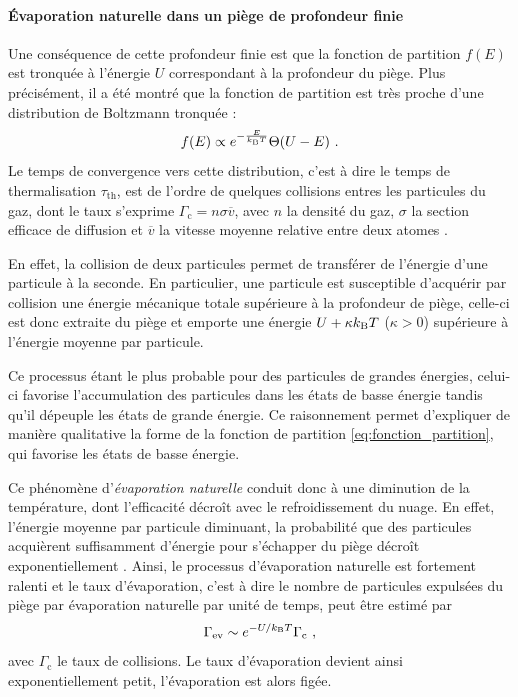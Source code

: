 \paragraph*{Évaporation naturelle dans un piège de profondeur finie}
Une conséquence de cette profondeur finie est que la fonction de partition $f(E)$ est tronquée à l'énergie $U$ correspondant à la profondeur du piège. Plus précisément, il a été montré que la fonction de partition est très proche d'une distribution de Boltzmann tronquée \citep{luiten1996kinetic}:
\begin{equation}
f(E)\propto e^{-\frac{E}{k_{\mathrm{B}} T}} \Theta(U-E) \text{ .}
\label{eq:fonction_partition}
\end{equation}
Le temps de convergence vers cette distribution, c'est à dire le temps de thermalisation $\tau_{\mathrm{th}}$, est de l'ordre de quelques collisions entres les particules du gaz, dont le taux s'exprime $\Gamma_{\mathrm{c}}=n \sigma \overline{v}$, avec $n$ la densité du gaz, $\sigma$ la section efficace de diffusion et $\overline{v}$ la vitesse moyenne relative entre deux atomes \citep{walraven2010elements}.

En effet, la collision de deux particules permet de transférer de l'énergie d'une particule à la seconde. En particulier, une particule est susceptible d'acquérir par collision une énergie mécanique totale supérieure à la profondeur de piège, celle-ci est donc extraite du piège et emporte une énergie $U+\kappa k_{\mathrm{B}} T$ ($\kappa>0$) supérieure à l'énergie moyenne par particule. %

Ce processus étant le plus probable pour des particules de grandes énergies, celui-ci favorise l'accumulation des particules dans les états de basse énergie tandis qu'il dépeuple les états de grande énergie. Ce raisonnement permet d'expliquer de manière qualitative la forme de la fonction de partition \ref{eq:fonction_partition}, qui favorise les états de basse énergie.

Ce phénomène d'\emph{évaporation naturelle} conduit donc à une diminution de la température, dont l'efficacité décroît avec le refroidissement du nuage. En effet, l'énergie moyenne par particule diminuant, la probabilité que des particules acquièrent suffisamment d'énergie pour s'échapper du piège décroît exponentiellement \citep{walraven2010elements}. Ainsi, le processus d'évaporation naturelle est fortement ralenti et le taux d'évaporation, c'est à dire le nombre de particules expulsées du piège par évaporation naturelle par unité de temps, peut être estimé par 
\begin{equation}
\Gamma_{\mathrm{ev}}\sim e^{-U/k_{\mathrm{B}} T} \Gamma_{\mathrm{c}} \text{ ,}
\label{eq:taux_evap}
\end{equation}
avec $\Gamma_{\mathrm{c}}$ le taux de collisions. Le taux d'évaporation devient ainsi exponentiellement petit, l'évaporation est alors figée. 	

